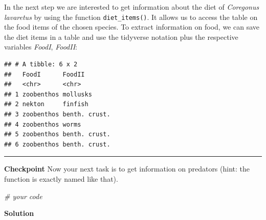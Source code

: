 \documentclass[
]{book}
\newenvironment{Shaded}{\begin{snugshade}}{\end{snugshade}}
\newcommand{\CommentTok}[1]{\textcolor[rgb]{0.56,0.35,0.01}{\textit{#1}}}
\newcommand{\KeywordTok}[1]{\textcolor[rgb]{0.13,0.29,0.53}{\textbf{#1}}}
\newcommand{\NormalTok}[1]{#1}
\newcommand{\OperatorTok}[1]{\textcolor[rgb]{0.81,0.36,0.00}{\textbf{#1}}}
\newcommand{\StringTok}[1]{\textcolor[rgb]{0.31,0.60,0.02}{#1}}
\begin{document}
In the next step we are interested to get information about the diet of \emph{Coregonus lavaretus} by using the function \texttt{diet\_items()}. It allows us to access the table on the food items of the chosen species. To extract information on food, we can save the diet items in a table and use the tidyverse notation plus the respective variables \emph{FoodI}, \emph{FoodII}:

\begin{Shaded}
\end{Shaded}

\begin{verbatim}
## # A tibble: 6 x 2
##   FoodI      FoodII       
##   <chr>      <chr>        
## 1 zoobenthos mollusks     
## 2 nekton     finfish      
## 3 zoobenthos benth. crust.
## 4 zoobenthos worms        
## 5 zoobenthos benth. crust.
## 6 zoobenthos benth. crust.
\end{verbatim}

\begin{center}\rule{0.5\linewidth}{0.5pt}\end{center}

\textbf{Checkpoint}
Now your next task is to get information on predators (hint: the function is exactly named like that).

\begin{Shaded}
\begin{Highlighting}[]
\CommentTok{# your code}
\end{Highlighting}
\end{Shaded}

\textbf{Solution}

\begin{Shaded}
\end{Shaded}
\end{document}
